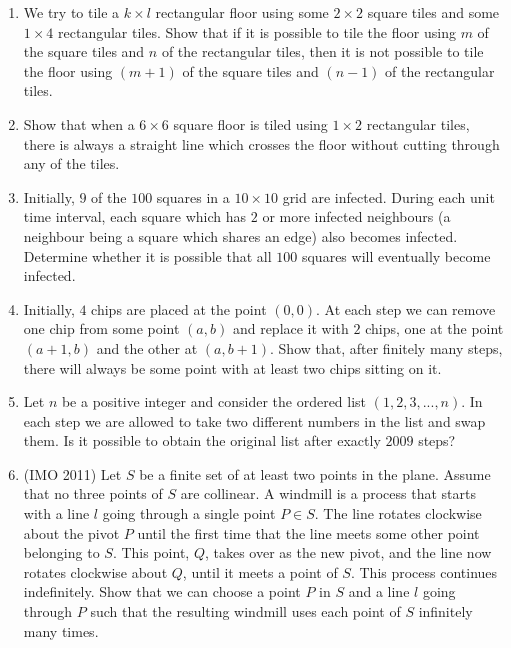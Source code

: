 \documentclass[12pt]{scrartcl}
\begin{document}
\begin{enumerate}
\item We try to tile a $k \times l$ rectangular floor using some $2 \times 2$ square tiles and some $1 \times 4$ rectangular tiles. Show that if it is possible to tile the floor using $m$ of the square tiles and $n$ of the rectangular tiles, then it is not possible to tile the floor using $(m + 1)$ of the square tiles and $(n - 1)$ of the rectangular tiles.

\item Show that when a $6 \times 6$ square floor is tiled using $1 \times 2$ rectangular tiles, there is always a straight line which crosses the floor without cutting through any of the tiles.

\item Initially, $9$ of the $100$ squares in a $10 \times 10$ grid are infected. During each unit time interval, each square which has $2$ or more infected neighbours (a neighbour being a square which shares an edge) also becomes infected. Determine whether it is possible that all $100$ squares will eventually become infected.

\item Initially, $4$ chips are placed at the point $(0, 0)$. At each step we can remove one chip from some point $(a, b)$ and replace it with $2$ chips, one at the point $(a + 1, b)$ and the other at $(a, b + 1)$. Show that, after finitely many steps, there will always be some point with at least two chips sitting on it.



\item Let $n$ be a positive integer and consider the ordered list $(1, 2, 3,...,n)$. In each step we are allowed to take two different numbers in the list and swap them. Is it possible to obtain the original list after exactly $2009$ steps?

\item (IMO 2011) Let $S$ be a finite set of at least two points in the plane. Assume that no three points of $S$ are collinear. A windmill is a process that starts with a line $l$ going through a single point $P \in S$. The line rotates clockwise about the pivot $P$ until the first time that the line meets some other point belonging to $S$. This point, $Q$, takes over as the new pivot, and the line now rotates clockwise about $Q$, until it meets a point of $S$. This process continues indefinitely. Show that we can choose a point $P$ in $S$ and a line $l$ going through $P$ such that the resulting windmill uses each point of $S$ infinitely many times.


\end{enumerate}
\end{document}
